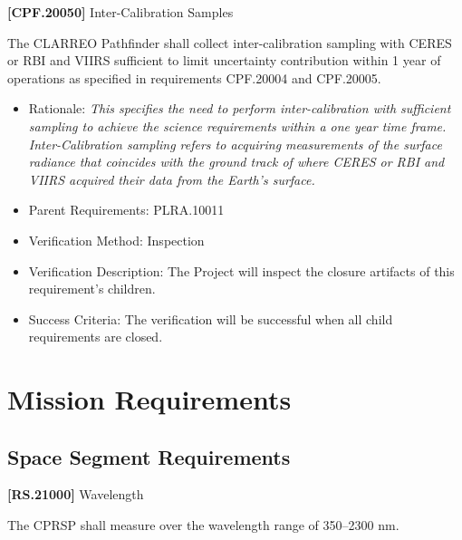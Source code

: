 \textbf{[CPF.20050]} Inter-Calibration Samples

The \gls{CLARREO} Pathfinder shall \gls{collect} inter-calibration sampling with \gls{CERES} or \gls{RBI} and \gls{VIIRS} sufficient to limit uncertainty contribution within 1 year of operations as specified in requirements \gls{CPF}.20004 and \gls{CPF}.20005.

\begin{itemize}
\item{} Rationale: \emph{This specifies the need to perform inter-calibration with sufficient sampling to achieve the science requirements within a one year time frame. Inter-Calibration sampling refers to acquiring measurements of the surface radiance that coincides with the ground track of where CERES or RBI and VIIRS acquired their data from the Earth's surface.}

\item{} Parent Requirements: PLRA.10011

\item{} Verification Method: Inspection

\item{} Verification Description: The Project will inspect the closure artifacts of this requirement's children.

\item{} Success Criteria: The verification will be successful when all child requirements are closed.

\end{itemize}

\section{Mission Requirements}
\label{missionrequirements}

\subsection{Space Segment Requirements}
\label{spacesegmentrequirements}

\textbf{[RS.21000]} Wavelength

The \gls{CPRSP} shall \gls{measure} over the wavelength range of 350--2300 nm.

